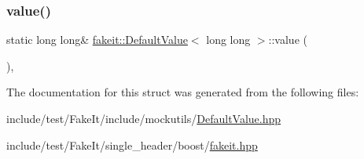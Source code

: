 \mbox{\label{structfakeit_1_1DefaultValue_3_01long_01long_01_4_ab955d01985ff900b3e625a53cf2a5607}} 
\subsubsection{\texorpdfstring{value()}{value()}\hspace{0.1cm}{\footnotesize\ttfamily [9/9]}}
{\footnotesize\ttfamily static long long\& \mbox{\hyperlink{structfakeit_1_1DefaultValue}{fakeit\+::\+Default\+Value}}$<$ long long $>$\+::value (\begin{DoxyParamCaption}{ }\end{DoxyParamCaption})\hspace{0.3cm}{\ttfamily [inline]}, {\ttfamily [static]}}



The documentation for this struct was generated from the following files\+:\begin{DoxyCompactItemize}
\item 
include/test/\+Fake\+It/include/mockutils/\mbox{\hyperlink{DefaultValue_8hpp}{Default\+Value.\+hpp}}\item 
include/test/\+Fake\+It/single\+\_\+header/boost/\mbox{\hyperlink{single__header_2boost_2fakeit_8hpp}{fakeit.\+hpp}}\end{DoxyCompactItemize}
